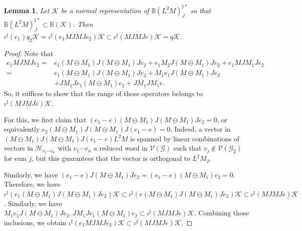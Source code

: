 \documentclass[a4paper, 11pt, reqno]{amsart}
\numberwithin{equation}{section}
\theoremstyle{plain}
\newtheorem{lemma}[thm]{Lemma}
\theoremstyle{remark}
\theoremstyle{definition}
\newcommand{\B}{\mathbb{B}\xspace}
\newcommand{\KK}{{\mathcal K}}
\newcommand{\BB}{{\mathbb{ B}}}
\newcommand{\HH}{{\mathcal H}}
\newcommand{\VV}{{\mathcal V}}
\newcommand{\GG}{{\mathcal G}}
\begin{document}
\begin{lemma}
    Let $ \KK $ be a normal representation of $\BB(L^2M)^{\sharp*}_J$ so that $ \BB(L^2M)^{\sharp*}_J\subset \B(\KK) $. Then $\iota^{\sharp}(e_1)q_2\KK =\overline{\iota^{\sharp}( e_1MJMJ e_2)\KK} \subset \overline{\iota^\sharp( MJMJe)\KK} = q\KK$.    
\end{lemma}
\begin{proof}
    Note that \begin{align*}
        e_1MJMJ e_2 =& e_1(M\ominus M_1)J(M\ominus M_1)J e_2+e_1M_2J(M\ominus M_1)J e_2 + e_1MJM_1J e_2\\
        =& e_1(M\ominus M_1)J(M\ominus M_1)J e_2+M_1e_1J(M\ominus M_1)J e_2\\ &+ JM_1Je_1(M\ominus M_1)e_2+ JM_1JM_1e.
    \end{align*}
    So, it suffices to show that the range of those operators belongs to $\iota^\sharp( MJMJe)\KK$.
    
    For this, we first claim that $  (e_1-e)(M\ominus M_1)J(M\ominus M_1)J e_2=0$, or equivalently $e_2(M\ominus M_1)J(M\ominus M_1)J (e_1-e)=0$. Indeed, a vector in $(M\ominus M_1)J(M\ominus M_1)J (e_1-e)L^2M$ is spanned by linear combinations of vectors in $ \HH_{v_1\cdots v_n} $ with $v_1\cdots v_n$ a reduced word in $\VV(\GG)$ such that $ v_j\notin \VV(\GG_2) $ for sum $j$, but this guarantees that the vector is orthogonal to $L^2M_2$.
    
    
    Similarly, we have $ (e_1-e)J(M\ominus M_1)J e_2 =(e_1-e)(M\ominus M_1)e_2 =0$. Therefore, we have $ \iota^{\sharp}(e_1(M\ominus M_1)J(M\ominus M_1)J e_2)\KK \subset \iota^\sharp( e(M\ominus M_1)J(M\ominus M_1)J e_2)\KK \subset \iota^\sharp( MJMJe)\KK  $. Similarly, we have $ M_1e_1J(M\ominus M_1)J e_2, JM_1Je_1(M\ominus M_1)e_2\subset \iota^\sharp( MJMJe)\KK $. Combining those inclusions, we obtain $ \iota^{\sharp}( e_1MJMJ e_2)\KK \subset \iota^\sharp( MJMJe)\KK $.
\end{proof}
\end{document}
